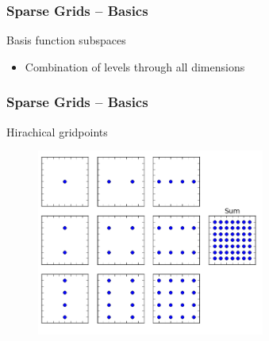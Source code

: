 \begin{frame}
  \frametitle{Sparse Grids -- Basics}
  \topline
  \vspace{-10px}
  \begin{block}{Basis function subspaces}
    \begin{itemize}
      \item Combination of levels through all dimensions
    \end{itemize}
  \end{block}
\end{frame}

\begin{frame}
  \frametitle{Sparse Grids -- Basics}
  \topline
  \vspace{-10px}
  \begin{block}{Hirachical gridpoints}
    \begin{figure}[!htp]
      \centering
      \includegraphics[width=7.5cm]{images/sparsegrid_hirach1}
      \vspace{-12px}
      \caption{}
    \end{figure}
  \end{block}
\end{frame}

